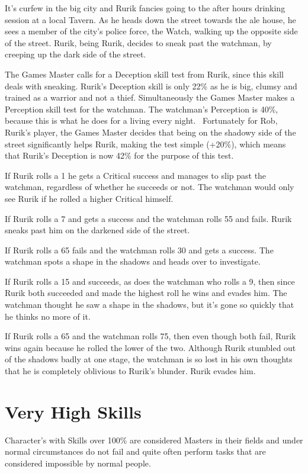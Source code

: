 \begin{rpg-examplebox}
It’s curfew in the big city and Rurik fancies going to the after hours drinking session at a local Tavern. As he heads down the street towards the ale house, he sees a member of the city’s police force, the Watch, walking up the opposite side of the street. Rurik, being Rurik, decides to sneak past the watchman, by creeping up the dark side of the street.

The Games Master calls for a Deception skill test from Rurik, since this skill deals with sneaking. Rurik’s Deception skill is only 22\% as he is big, clumsy and trained as a warrior and not a thief. Simultaneously the Games Master makes a Perception skill test for the watchman. The watchman’s Perception is 40\%, because this is what he does for a living every night.  Fortunately for Rob, Rurik’s player, the Games Master decides that being on the shadowy side of the street significantly helps Rurik, making the test simple (+20\%), which means that Rurik’s Deception is now 42\% for the purpose of this test.

If Rurik rolls a 1 he gets a Critical success and manages to slip past the watchman, regardless of whether he succeeds or not. The watchman would only see Rurik if he rolled a higher Critical himself.

If Rurik rolls a 7 and gets a success and the watchman rolls 55 and fails. Rurik sneaks past him on the darkened side of the street.

If Rurik rolls a 65 fails and the watchman rolls 30 and gets a success. The watchman spots a shape in the shadows and heads over to investigate.

If Rurik rolls a 15 and succeeds, as does the watchman who rolls a 9, then since Rurik both succeeded and made the highest roll he wins and evades him. The watchman thought he saw a shape in the shadows, but it’s gone so quickly that he thinks no more of it.

If Rurik rolls a 65 and the watchman rolls 75, then even though both fail, Rurik wins again because he rolled the lower of the two. Although Rurik stumbled out of the shadows badly at one stage, the watchman is so lost in his own thoughts that he is completely oblivious to Rurik’s blunder. Rurik evades him.
\end{rpg-examplebox}


\section{Very High Skills}
Character’s with Skills over 100\% are considered Masters in their fields and under normal circumstances do not fail and quite often perform tasks that are considered impossible by normal people.

